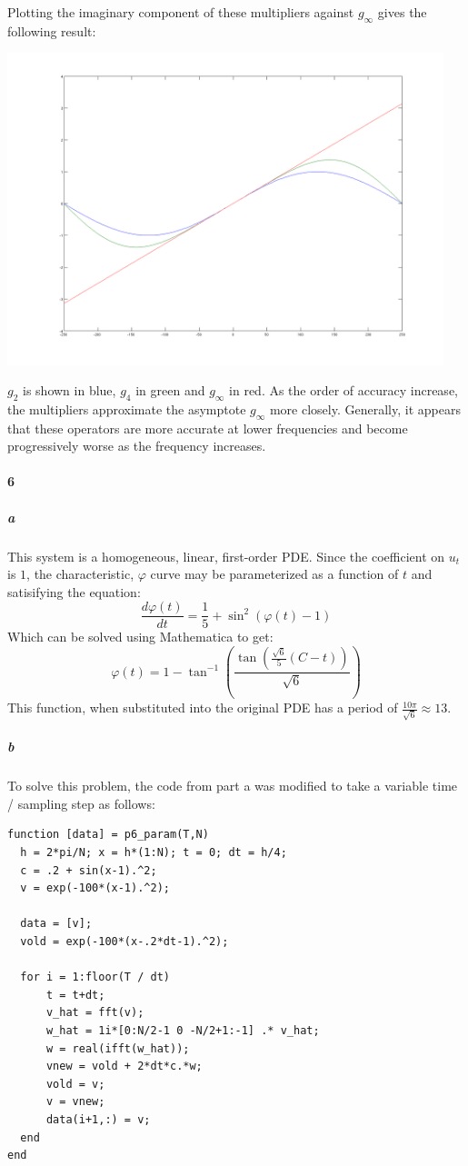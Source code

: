 \documentclass{article}
\begin{document}
Plotting the imaginary component of these multipliers against $g_\infty$ gives the following result:

\begin{center}
\includegraphics[width=5in]{hw1_p5_fig1.png}
\end{center}

$g_2$ is shown in blue, $g_4$ in green and $g_\infty$ in red.  As the order of accuracy increase, the multipliers approximate the asymptote $g_\infty$ more closely.  Generally, it appears that these operators are more accurate at lower frequencies and become progressively worse as the frequency increases.

\paragraph{6}
\subparagraph{a}
This system is a homogeneous, linear, first-order PDE.  Since the coefficient on $u_t$ is $1$, the characteristic, $\varphi$ curve may be parameterized as a function of $t$ and satisifying the equation:
\[ \frac{d\varphi(t)}{dt} = \frac{1}{5} + \sin^2( \varphi(t) - 1 ) \]
Which can be solved using Mathematica to get:
\[ \varphi(t) = 1-\tan ^{-1}\left(\frac{\tan \left(\frac{\sqrt{6}}{5} \left( C - t \right)\right)}{\sqrt{6}}\right) \]
This function, when substituted into the original PDE has a period of $\frac{10 \pi}{\sqrt{6} } \approx 13$.

\subparagraph{b}

To solve this problem, the code from part a was modified to take a variable time / sampling step as follows:

\begin{verbatim}
function [data] = p6_param(T,N)
  h = 2*pi/N; x = h*(1:N); t = 0; dt = h/4;
  c = .2 + sin(x-1).^2;
  v = exp(-100*(x-1).^2); 

  data = [v];
  vold = exp(-100*(x-.2*dt-1).^2);
  
  for i = 1:floor(T / dt)
      t = t+dt;
      v_hat = fft(v);
      w_hat = 1i*[0:N/2-1 0 -N/2+1:-1] .* v_hat;
      w = real(ifft(w_hat)); 
      vnew = vold + 2*dt*c.*w; 
      vold = v; 
      v = vnew;
      data(i+1,:) = v;
  end
end
\end{verbatim}
\end{document}
